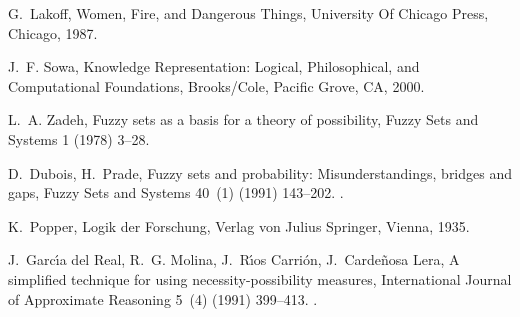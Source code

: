\documentclass[review]{elsarticle}
\theoremstyle{definition}
\begin{document}
\begin{thebibliography}{10}
G.~Lakoff, Women, Fire, and Dangerous Things, University Of Chicago Press,
  Chicago, 1987.

J.~F. Sowa, Knowledge Representation: Logical, Philosophical, and Computational
  Foundations, Brooks/Cole, Pacific Grove, CA, 2000.

L.~A. Zadeh, Fuzzy sets as a basis for a theory of possibility, Fuzzy Sets and
  Systems 1 (1978) 3--28.

D.~Dubois, H.~Prade, Fuzzy sets and probability: Misunderstandings, bridges and
  gaps, Fuzzy Sets and Systems 40~(1) (1991) 143--202.
\newblock \href {http://dx.doi.org/10.1109/FUZZY.1993.327367}
  {}.

K.~Popper, Logik der Forschung, Verlag von Julius Springer, Vienna, 1935.

J.~{Garc\'{\i}a del Real}, R.~G. Molina, J.~{R\'{\i}os Carri\'on},
  J.~{Carde\~nosa Lera}, A simplified technique for using necessity-possibility
  measures, International Journal of Approximate Reasoning 5~(4) (1991)
  399--413.
\newblock \href {http://dx.doi.org/10.1016/0888-613X(91)90019-I}
  {}.

\end{thebibliography}
\end{document}
